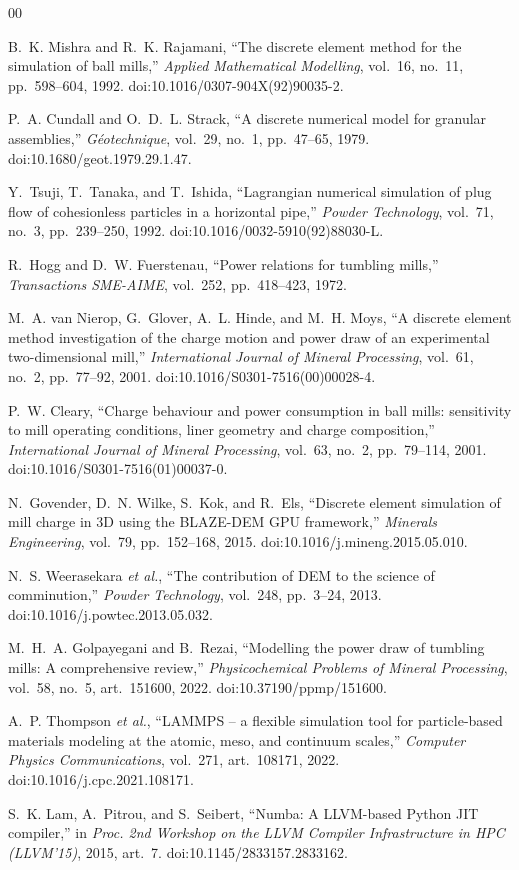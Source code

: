\documentclass[journal]{IEEEtran}
\begin{document}
\begin{thebibliography}{00}

 B.~K. Mishra and R.~K. Rajamani, ``The discrete element method for the simulation of ball
mills,'' \emph{Applied Mathematical Modelling}, vol.~16, no.~11, pp.~598--604, 1992.
doi:10.1016/0307-904X(92)90035-2.

 P.~A. Cundall and O.~D.~L. Strack, ``A discrete numerical model for granular assemblies,''
\emph{G\'eotechnique}, vol.~29, no.~1, pp.~47--65, 1979. doi:10.1680/geot.1979.29.1.47.

 Y.~Tsuji, T.~Tanaka, and T.~Ishida, ``Lagrangian numerical simulation of plug flow of
cohesionless particles in a horizontal pipe,'' \emph{Powder Technology}, vol.~71, no.~3, pp.~239--250, 1992.
doi:10.1016/0032-5910(92)88030-L.

 R.~Hogg and D.~W. Fuerstenau, ``Power relations for tumbling mills,'' \emph{Transactions
SME-AIME}, vol.~252, pp.~418--423, 1972.

 M.~A. van Nierop, G.~Glover, A.~L. Hinde, and M.~H. Moys, ``A discrete element method
investigation of the charge motion and power draw of an experimental two-dimensional mill,'' \emph{International
Journal of Mineral Processing}, vol.~61, no.~2, pp.~77--92, 2001. doi:10.1016/S0301-7516(00)00028-4.

 P.~W. Cleary, ``Charge behaviour and power consumption in ball mills: sensitivity to mill
operating conditions, liner geometry and charge composition,'' \emph{International Journal of Mineral
Processing}, vol.~63, no.~2, pp.~79--114, 2001. doi:10.1016/S0301-7516(01)00037-0.

 N.~Govender, D.~N. Wilke, S.~Kok, and R.~Els, ``Discrete element simulation of mill charge in
3D using the BLAZE-DEM GPU framework,'' \emph{Minerals Engineering}, vol.~79, pp.~152--168, 2015.
doi:10.1016/j.mineng.2015.05.010.

 N.~S. Weerasekara \emph{et al.}, ``The contribution of DEM to the science of
comminution,'' \emph{Powder Technology}, vol.~248, pp.~3--24, 2013. doi:10.1016/j.powtec.2013.05.032.

 M.~H.~A. Golpayegani and B.~Rezai, ``Modelling the power draw of tumbling mills: A
comprehensive review,'' \emph{Physicochemical Problems of Mineral Processing}, vol.~58, no.~5, art.~151600,
2022. doi:10.37190/ppmp/151600.

 A.~P. Thompson \emph{et al.}, ``LAMMPS -- a flexible simulation tool for particle-based
materials modeling at the atomic, meso, and continuum scales,'' \emph{Computer Physics Communications}, vol.~271,
art.~108171, 2022. doi:10.1016/j.cpc.2021.108171.

 S.~K. Lam, A.~Pitrou, and S.~Seibert, ``Numba: A LLVM-based Python JIT compiler,'' in \emph{Proc.
2nd Workshop on the LLVM Compiler Infrastructure in HPC (LLVM'15)}, 2015, art.~7. doi:10.1145/2833157.2833162.

\end{thebibliography}
\end{document}
